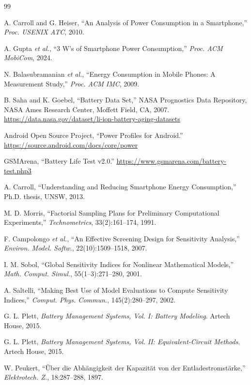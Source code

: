 \documentclass[11pt,a4paper]{ctexart}
\begin{document}
\begin{thebibliography}{99}
\setlength{\itemsep}{2pt}

 A. Carroll and G. Heiser, ``An Analysis of Power Consumption in a Smartphone,'' \textit{Proc. USENIX ATC}, 2010.

 A. Gupta \textit{et al.}, ``3 W's of Smartphone Power Consumption,'' \textit{Proc. ACM MobiCom}, 2024.

 N. Balasubramanian \textit{et al.}, ``Energy Consumption in Mobile Phones: A Measurement Study,'' \textit{Proc. ACM IMC}, 2009.

 B. Saha and K. Goebel, ``Battery Data Set,'' NASA Prognostics Data Repository, NASA Ames Research Center, Moffett Field, CA, 2007. \url{https://data.nasa.gov/dataset/li-ion-battery-aging-datasets}

 Android Open Source Project, ``Power Profiles for Android.'' \url{https://source.android.com/docs/core/power}

 GSMArena, ``Battery Life Test v2.0.'' \url{https://www.gsmarena.com/battery-test.php3}

 A. Carroll, ``Understanding and Reducing Smartphone Energy Consumption,'' Ph.D. thesis, UNSW, 2013.

 M. D. Morris, ``Factorial Sampling Plans for Preliminary Computational Experiments,'' \textit{Technometrics}, 33(2):161--174, 1991.

 F. Campolongo \textit{et al.}, ``An Effective Screening Design for Sensitivity Analysis,'' \textit{Environ. Model. Softw.}, 22(10):1509--1518, 2007.

 I. M. Sobol, ``Global Sensitivity Indices for Nonlinear Mathematical Models,'' \textit{Math. Comput. Simul.}, 55(1--3):271--280, 2001.

 A. Saltelli, ``Making Best Use of Model Evaluations to Compute Sensitivity Indices,'' \textit{Comput. Phys. Commun.}, 145(2):280--297, 2002.

 G. L. Plett, \textit{Battery Management Systems, Vol. I: Battery Modeling}. Artech House, 2015.

 G. L. Plett, \textit{Battery Management Systems, Vol. II: Equivalent-Circuit Methods}. Artech House, 2015.

 W. Peukert, ``\"Uber die Abh\"angigkeit der Kapazit\"at von der Entladestromst\"arke,'' \textit{Elektrotech. Z.}, 18:287--288, 1897.


\end{thebibliography}
\end{document}
